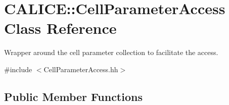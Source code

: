 \section{C\-A\-L\-I\-C\-E\-:\-:Cell\-Parameter\-Access Class Reference}
\label{classCALICE_1_1CellParameterAccess}


Wrapper around the cell parameter collection to facilitate the access.  




{\ttfamily \#include $<$Cell\-Parameter\-Access.\-hh$>$}

\subsection*{Public Member Functions}
